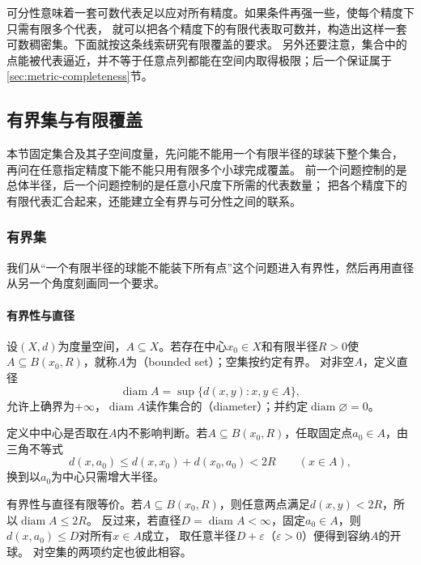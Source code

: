 可分性意味着一套可数代表足以应对所有精度。如果条件再强一些，使每个精度下只需有限多个代表，
就可以把各个精度下的有限代表取可数并，构造出这样一套可数稠密集。下面就按这条线索研究有限覆盖的要求。
另外还要注意，集合中的点能被代表逼近，并不等于任意点列都能在空间内取得极限；后一个保证属于\ref{sec:metric-completeness}节。

\subsection{有界集与有限覆盖}
\label{sec:metric-covering-budgets}

本节固定集合及其子空间度量，先问能不能用一个有限半径的球装下整个集合，
再问在任意指定精度下能不能只用有限多个小球完成覆盖。
前一个问题控制的是总体半径，后一个问题控制的是任意小尺度下所需的代表数量；
把各个精度下的有限代表汇合起来，还能建立全有界与可分性之间的联系。

\subsubsection{有界集}
\label{sec:metric-boundedness}

我们从“一个有限半径的球能不能装下所有点”这个问题进入有界性，然后再用直径从另一个角度刻画同一个要求。

\paragraph{有界性与直径}

\begin{definition}[有界集与直径]
\label{def:metric-bounded}
设$(X,d)$为度量空间，$A\subseteq X$。若存在中心$x_0\in X$和有限半径$R>0$使$A\subseteq B(x_0,R)$，就称$A$为（bounded set）；空集按约定有界。
对非空$A$，定义直径
\[
  \operatorname{diam}A=\sup\{d(x,y):x,y\in A\},
\]
允许上确界为$+\infty$，$\operatorname{diam}A$读作集合的（diameter）；并约定$\operatorname{diam}\varnothing=0$。
\end{definition}

定义中中心是否取在$A$内不影响判断。若$A\subseteq B(x_0,R)$，任取固定点$a_0\in A$，由三角不等式
\[
  d(x,a_0)\leq d(x,x_0)+d(x_0,a_0)<2R\qquad(x\in A),
\]
换到以$a_0$为中心只需增大半径。

有界性与直径有限等价。若$A\subseteq B(x_0,R)$，则任意两点满足$d(x,y)<2R$，所以$\operatorname{diam}A\leq2R$。
反过来，若直径$D=\operatorname{diam}A<\infty$，固定$a_0\in A$，则$d(x,a_0)\leq D$对所有$x\in A$成立，
取任意半径$D+\varepsilon$（$\varepsilon>0$）便得到容纳$A$的开球。
对空集的两项约定也彼此相容。

